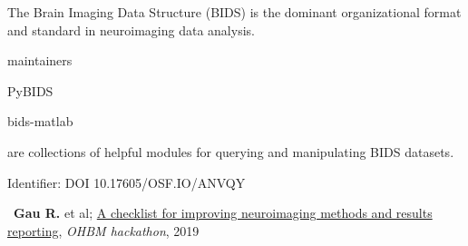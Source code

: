 
The Brain Imaging Data Structure (BIDS) is the dominant organizational format and standard in neuroimaging data analysis.
    
maintainers

    
    PyBIDS 
    
    bids-matlab 
    
    are collections of helpful modules for querying and manipulating BIDS datasets.

   
Identifier: DOI 10.17605/OSF.IO/ANVQY

 
    
\textbullet~\textbf{Gau R.} et al; 
\href{https://github.com/ohbm/hackathon2019/issues/49}{A checklist for improving neuroimaging methods and results reporting}, \textit{OHBM hackathon}, 2019
